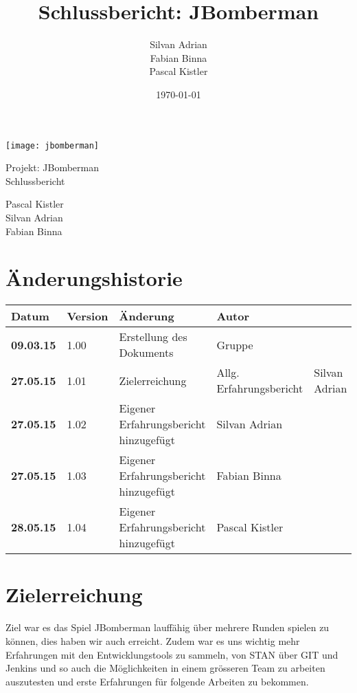 \documentclass[11pt]{scrartcl}
\title{Schlussbericht: JBomberman}
\author{Silvan Adrian \\ Fabian Binna \\ Pascal Kistler}
\date{\today{}}
\begin{document}
\def\arraystretch{1.5}
\begin{titlepage}
\begin{center}
\vspace{10em}
\texttt{[image: jbomberman]}
\vspace{10em}
\end{center}
\begin{center}
\huge {Projekt: JBomberman} \\
\huge {Schlussbericht}
\end{center}
\begin{center}
\vspace{10em}
\LARGE {Pascal Kistler} \\
\LARGE {Silvan Adrian} \\
\LARGE {Fabian Binna}
\end{center}

\end{titlepage}

\newpage
\section{Änderungshistorie}
\label{sec:Änderungen}

\begin{tabularx}{\linewidth}{l l l l}
\textbf{Datum} & \textbf{Version} & \textbf{Änderung}  & \textbf{Autor} \\
\hline
\textbf{09.03.15} & 1.00 & Erstellung des Dokuments & Gruppe \\
\textbf{27.05.15} & 1.01 & Zielerreichung & Allg. Erfahrungsbericht & Silvan 
Adrian\\
\textbf{27.05.15} & 1.02 & Eigener Erfahrungsbericht hinzugefügt & Silvan 
Adrian\\
\textbf{27.05.15} & 1.03 & Eigener Erfahrungsbericht hinzugefügt & Fabian Binna\\
\textbf{28.05.15} & 1.04 & Eigener Erfahrungsbericht hinzugefügt & Pascal Kistler
\end{tabularx}

\newpage
\tableofcontents
\newpage

\section{Zielerreichung}
Ziel war es das Spiel JBomberman lauffähig über mehrere Runden spielen zu 
können, dies haben wir auch erreicht.
Zudem war es uns wichtig mehr Erfahrungen mit den Entwicklungstools zu sammeln,
von STAN über GIT und Jenkins und so auch die Möglichkeiten 
in einem grösseren Team zu arbeiten auszutesten und erste Erfahrungen 
für folgende Arbeiten zu bekommen.
\end{document}
